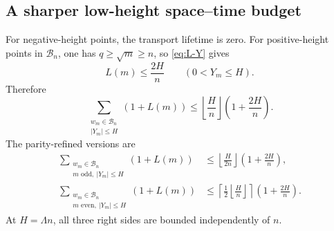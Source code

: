 \subsection{A sharper low-height space--time budget}

For negative-height points, the transport lifetime is zero.  For positive-height points in $\mathscr B_n$, one has $q\ge\sqrt m\ge n$, so \cref{eq:L-Y} gives
\begin{equation}
 L(m)\le\frac{2H}{n}
 \qquad(0<Y_m\le H).
 \label{eq:L-H-n}
\end{equation}
Therefore
\begin{equation}
 \boxed{
 \sum_{\substack{w_m\in\mathscr B_n\\|Y_m|\le H}}
 (1+L(m))
 \le
 \left\lfloor\frac{H}{n}\right\rfloor
 \left(1+\frac{2H}{n}\right).
 }
 \label{eq:space-time-budget}
\end{equation}
The parity-refined versions are
\begin{align}
 \sum_{\substack{w_m\in\mathscr B_n\\m\text{ odd},\ |Y_m|\le H}}
 (1+L(m))
 &\le
 \left\lfloor\frac{H}{2n}\right\rfloor
 \left(1+\frac{2H}{n}\right),
 \label{eq:odd-space-time-budget}\\
 \sum_{\substack{w_m\in\mathscr B_n\\m\text{ even},\ |Y_m|\le H}}
 (1+L(m))
 &\le
 \left\lceil\frac{1}{2}
 \left\lfloor\frac{H}{n}\right\rfloor\right\rceil
 \left(1+\frac{2H}{n}\right).
 \label{eq:even-space-time-budget}
\end{align}
At $H=\Lambda n$, all three right sides are bounded independently of $n$.

